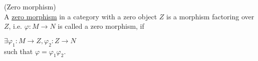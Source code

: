 \begin{definition}{(Zero morphism)}\label{def:zero_morphism}\\
A \ul{zero morphism} in a category with a zero object $Z$ is a morphism factoring over $Z$, i.e. $\varphi : M \rightarrow N$ is called a zero
morphism, if\\
\begin{minipage}{.35\textwidth}
\end{minipage}
\begin{minipage}{.65\textwidth}
$\exists \varphi_{1} : M \rightarrow Z, \varphi_{2} : Z \rightarrow N$\\
such that $\varphi = \varphi_{1}\varphi_{2}$.
\end{minipage}
\end{definition}

